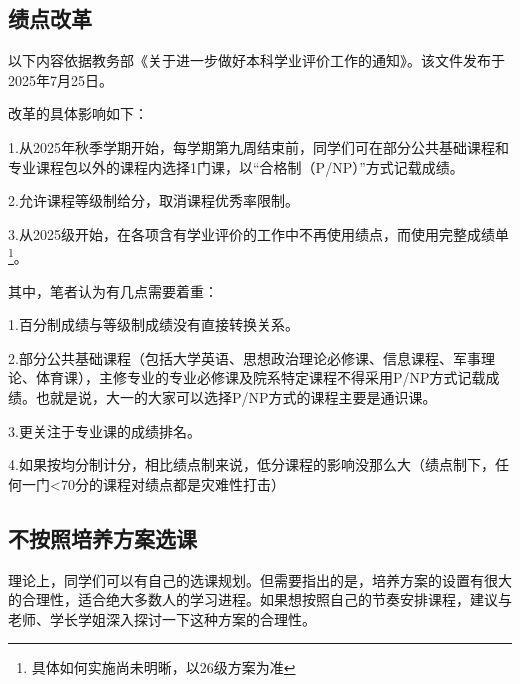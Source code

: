 \subsection{绩点改革}
以下内容依据教务部《关于进一步做好本科学业评价工作的通知》。该文件发布于2025年7月25日。

\vspace{10pt}

改革的具体影响如下：

\vspace{5pt}

1.从2025年秋季学期开始，每学期第九周结束前，同学们可在部分公共基础课程和专业课程包以外的课程内选择1门课，以“合格制（P/NP）”方式记载成绩。

\vspace{5pt}

2.允许课程等级制给分，取消课程优秀率限制。

\vspace{5pt}

3.从2025级开始，在各项含有学业评价的工作中不再使用绩点，而使用完整成绩单\footnote{具体如何实施尚未明晰，以26级方案为准}。

\vspace{5pt}

其中，笔者认为有几点需要着重：

\vspace{5pt}

1.百分制成绩与等级制成绩没有直接转换关系。

\vspace{5pt}

2.部分公共基础课程（包括大学英语、思想政治理论必修课、信息课程、军事理论、体育课），主修专业的专业必修课及院系特定课程不得采用P/NP方式记载成绩。也就是说，大一的大家可以选择P/NP方式的课程主要是通识课。

\vspace{5pt}

3.更关注于专业课的成绩排名。

\vspace{5pt}

4.如果按均分制计分，相比绩点制来说，低分课程的影响没那么大（绩点制下，任何一门<70分的课程对绩点都是灾难性打击）

\subsection{不按照培养方案选课}
理论上，同学们可以有自己的选课规划。但需要指出的是，培养方案的设置有很大的合理性，适合绝大多数人的学习进程。如果想按照自己的节奏安排课程，建议与老师、学长学姐深入探讨一下这种方案的合理性。
